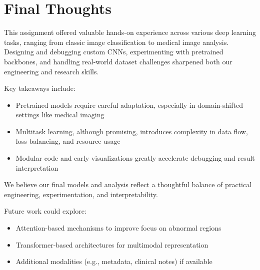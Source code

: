 \documentclass[11pt]{article}
\begin{document}
\section*{Final Thoughts}
This assignment offered valuable hands-on experience across various deep learning tasks, ranging from classic image classification to medical image analysis. Designing and debugging custom CNNs, experimenting with pretrained backbones, and handling real-world dataset challenges sharpened both our engineering and research skills.

Key takeaways include:
\begin{itemize}
    \item Pretrained models require careful adaptation, especially in domain-shifted settings like medical imaging
    \item Multitask learning, although promising, introduces complexity in data flow, loss balancing, and resource usage
    \item Modular code and early visualizations greatly accelerate debugging and result interpretation
\end{itemize}

We believe our final models and analysis reflect a thoughtful balance of practical engineering, experimentation, and interpretability.

Future work could explore:
\begin{itemize}
    \item Attention-based mechanisms to improve focus on abnormal regions
    \item Transformer-based architectures for multimodal representation
    \item Additional modalities (e.g., metadata, clinical notes) if available
\end{itemize}
\end{document}
